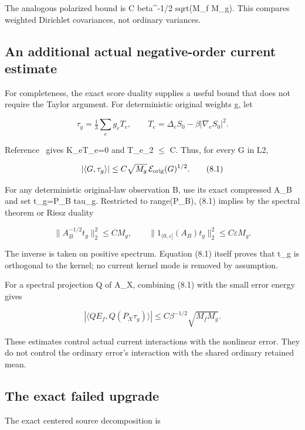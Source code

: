 \documentclass[
  11pt,
]{article}
\begin{document}
The analogous polarized bound is C beta\^{}-1/2 sqrt(M\_f M\_g). This
compares weighted Dirichlet covariances, not ordinary variances.

\hypertarget{an-additional-actual-negative-order-current-estimate}{%
\subsection{An additional actual negative-order current
estimate}\label{an-additional-actual-negative-order-current-estimate}}

For completeness, the exact score duality supplies a useful bound that
does not require the Taylor argument. For deterministic original weights
g, let

\[
 \tau_g=\tfrac13\sum_eg_eT_e,\qquad
 T_e=\Delta_eS_0-\beta|\nabla_eS_0|^2.
\]

Reference~\cite{CT} gives K\_eT\_e=0 and \textbar\textbar T\_e\textbar\textbar\_2
\(\leq\) C. Thus, for every G in L2,

\[
 |\langle G,\tau_g\rangle|
 \le C\sqrt{M_g}\,\mathcal E_{\rm orig}(G)^{1/2}.
\tag{8.1}
\]

For any deterministic original-law observation B, use its exact
compressed A\_B and set t\_g=P\_B tau\_g. Restricted to range(P\_B),
(8.1) implies by the spectral theorem or Riesz duality

\[
 \boxed{\quad
 \|A_B^{-1/2}t_g\|_2^2\le CM_g,
 \qquad
 \|1_{(0,\varepsilon]}(A_B)t_g\|_2^2\le C\varepsilon M_g.
 \quad}
\tag{8.2}
\]

The inverse is taken on positive spectrum. Equation (8.1) itself proves
that t\_g is orthogonal to the kernel; no current kernel mode is removed
by assumption.

For a spectral projection Q of A\_X, combining (8.1) with the small
error energy gives

\[
 |\langle QE_f,Q(P_X\tau_g)\rangle|
 \le C\beta^{-1/2}\sqrt{M_fM_g}.
\tag{8.3}
\]

These estimates control actual current interactions with the nonlinear
error. They do not control the ordinary error's interaction with the
shared ordinary retained mean.

\hypertarget{the-exact-failed-upgrade}{%
\subsection{The exact failed upgrade}\label{the-exact-failed-upgrade}}

The exact centered source decomposition is
\end{document}
